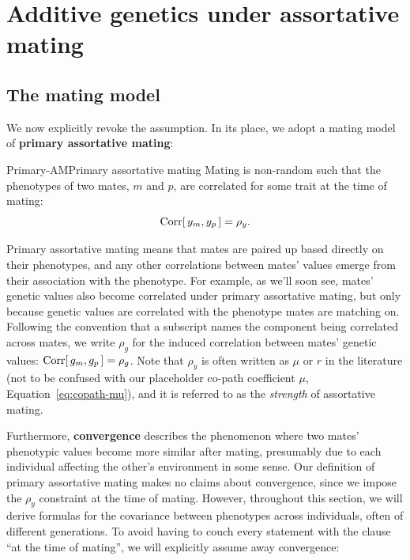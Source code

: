 \documentclass[12pt]{article}
\numberwithin{equation}{section}
\begin{document}
\section{Additive genetics under assortative mating}\label{sec:am}

\subsection{The mating model}\label{sec:am-model}
We now explicitly revoke the  assumption.
In its place, we adopt a mating model of \textbf{primary assortative mating}:

\begin{assumption}{Primary-AM}{Primary assortative mating}
Mating is non-random such that the phenotypes of two mates, $m$ and $p$, are correlated for some trait at the time of mating:
$$ \mathrm{Corr}[\,y_m, y_p\,] = \rho_y . $$
\end{assumption}
Primary assortative mating means that mates are paired up based directly on their phenotypes, and any other correlations between mates' values emerge from their association with the phenotype.
For example, as we'll soon see, mates' genetic values also become correlated under primary assortative mating, but only because genetic values are correlated with the phenotype mates are matching on.
Following the convention that a subscript names the component being correlated across mates, we write $\rho_g$ for the induced correlation between mates' genetic values:
$ \mathrm{Corr}[\,g_m, g_p\,] = \rho_g $.
Note that $\rho_y$ is often written as $\mu$ or $r$ in the literature (not to be confused with our placeholder co-path coefficient $\mu$, Equation~\eqref{eq:copath-mu}), and it is referred to as the \emph{strength} of assortative mating.

Furthermore, \textbf{convergence} describes the phenomenon where two mates' phenotypic values become more similar after mating, presumably due to each individual affecting the other's environment in some sense.
Our definition of primary assortative mating makes no claims about convergence, since we impose the $\rho_y$ constraint at the time of mating.
However, throughout this section, we will derive formulas for the covariance between phenotypes across individuals, often of different generations.
To avoid having to couch every statement with the clause ``at the time of mating'', we will explicitly assume away convergence:
\end{document}
